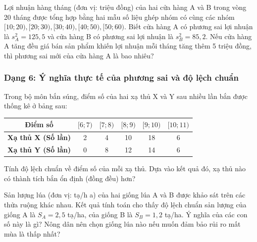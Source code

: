 \documentclass[12pt]{article}
\begin{document}
	\begin{btdo}[title={Bài 6}]
		Lợi nhuận hàng tháng (đơn vị: triệu đồng) của hai cửa hàng A và B trong vòng 20 tháng được tổng hợp bằng hai mẫu số liệu ghép nhóm có cùng các nhóm $[10; 20), [20; 30), [30; 40), [40; 50), [50; 60)$. 
		Biết cửa hàng A có phương sai lợi nhuận là $s_A^2 = 125,5$ và cửa hàng B có phương sai lợi nhuận là $s_B^2 = 85,2$. Nếu cửa hàng A tăng đều giá bán sản phẩm khiến lợi nhuận mỗi tháng tăng thêm 5 triệu đồng, thì phương sai mới của cửa hàng A là bao nhiêu?
	\end{btdo}
	
	\subsubsection{Dạng 6: Ý nghĩa thực tế của phương sai và độ lệch chuẩn}
	
	\begin{btxanh}[title={Bài 1}]
		Trong bộ môn bắn súng, điểm số của hai xạ thủ X và Y sau nhiều lần bắn được thống kê ở bảng sau:
		\begin{center}
			\renewcommand{\arraystretch}{1.3}
			\begin{tabular}{|c|c|c|c|c|c|}
				\hline
				\textbf{Điểm số} & $[6; 7)$ & $[7; 8)$ & $[8; 9)$ & $[9; 10)$ & $[10; 11)$ \\
				\hline
				\textbf{Xạ thủ X (Số lần)} & 2 & 4 & 10 & 18 & 6 \\
				\hline
				\textbf{Xạ thủ Y (Số lần)} & 0 & 8 & 12 & 14 & 6 \\
				\hline
			\end{tabular}
		\end{center}
		Tính độ lệch chuẩn về điểm số của mỗi xạ thủ. Dựa vào kết quả đó, xạ thủ nào có thành tích bắn ổn định (đồng đều) hơn?
	\end{btxanh}
	
	\begin{btxanh}[title={Bài 2}]
		Sản lượng lúa (đơn vị: tạ/h a) của hai giống lúa A và B được khảo sát trên các thửa ruộng khác nhau. Kết quả tính toán cho thấy độ lệch chuẩn sản lượng của giống A là $S_A = 2,5$ tạ/ha, của giống B là $S_B = 1,2$ tạ/ha. 
		Ý nghĩa của các con số này là gì? Nông dân nên chọn giống lúa nào nếu muốn đảm bảo rủi ro mất mùa là thấp nhất?
	\end{btxanh}
	
\end{document}
